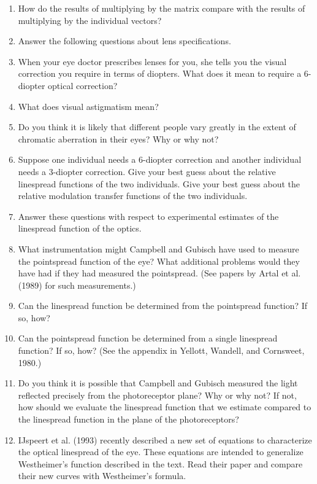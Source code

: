 \begin{enumerate}
 \item How do the results of multiplying by the matrix compare with
the results of multiplying by the individual vectors?

 \ee

\item Answer the following questions about lens specifications.

 \be
 \item  When your eye doctor prescribes lenses for you, she tells you
the visual correction you require in terms of diopters.
What does it mean to require a 6-diopter optical correction?

 \item What does visual astigmatism mean?

 \item Do you think it is likely that different people
vary greatly in the extent of chromatic aberration in their eyes?
Why or why not?

 \item Suppose one individual needs a 6-diopter correction
and another individual needs a 3-diopter correction.
Give your best guess about the relative
linespread functions of the two individuals.
Give your best guess about the relative
modulation transfer functions of the two individuals.

 \ee

\item Answer these questions with respect
to experimental estimates
of the linespread function of the optics.

 \be

 \item What instrumentation might Campbell and Gubisch
have used to measure the pointspread function of the eye?
What additional problems would they have had if they
had measured the pointspread.
(See papers by Artal et al. (1989) for such measurements.)

 \item Can the linespread function be determined from the pointspread
function?  If so, how?

 \item Can the pointspread function be determined from a single
linespread function? If so, how?  
(See the appendix in Yellott, Wandell, and Cornsweet, 1980.)

 \item Do you think it is possible that Campbell and Gubisch
measured the light reflected precisely from the photoreceptor plane?
Why or why not?
If not, how should we evaluate the linespread function that we
estimate compared to the linespread function in the
plane of the photoreceptors?

\item IJspeert et al. (1993) recently described
a new set of equations to characterize the optical linespread of the
eye.
These equations are intended to generalize
Westheimer's function described in the text.
Read their paper and compare their new curves with
Westheimer's formula.

 \ee


\end{enumerate}	%
